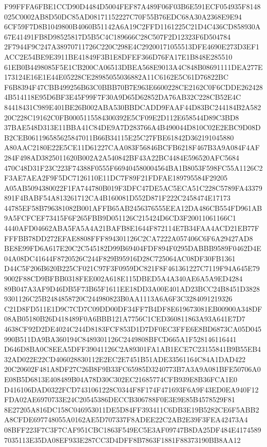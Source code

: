 \documentclass[UTF8,fontset=fandol,zihao=-4,a4paper]{ctexart}
\begin{document}
{{F99FFFA6FBE1CCD90D4484D5004FEF87A489F06F03B6E591ECF054935F8148025C0002AB8D50DC85AD08171152227C70F55B76EDC68A30A2368E9E94
6CF59F7D8B1049800B4060B51142A6A19C2FFD1161225C21D4C436CD858930A67E41491FB8D98525817D5B5C4C189666C28C507F2D12323F6D504784
2F7944F9C247A38970711726C220C298E4C29200171055513DFE4690E273D3EF1ACC2E54BE9E3911BE41849F3B1E8DFEF366D76FA17E1B848E285510
61EB0B4498085F5E1CB200CA06513DBEA568E9013A4C848B08691111DEA277E173124E16E1E44E05228CE28985055036882A11C6162E5C61D76822BC
F6B8394F47CBB499256B63C0BBB70B7E963E6600228CE2162C0F6CDDE2624284B514118E95D6BF3E45F99F7F30A9D65D62852DA76AB32C228CB52E4C
84418431C989E401BE26B002ABA530BBDCADD9FAAF44D83BC244184B2A58220C228C19162C0FB0005115584300392E5CF09E2D112E658544D89C3BD8
37BAE548D313E11BBA41C84DE9A7D283766A4B490044D810C02E2EBC9D08DB2CEB061196585625847011B66B34115E25C27FBE61842D362191045880
A80AAC2180E22E5CE11D61227CAA083F56846BCFB6218F467B3A9A084F4AF284F498AD3825011620B002A2A540842BF43A22BC4484E596520AFC5684
470C48D31F23C223F74388F0555F669404580004564BA1B8053F598FC55A1126C2F3AE7AEA2F9F5DC7126110E11DC7F89F21FDFAE189795584F29205
A05AB5094380022F1FA744780B019F3DFC47DE5AC5ECA51C228C5789FA43379891F4BABF54A813261712CA4B160081D552D871F222C2458474E17173
44785EF58B796381082B001AFFB65AB2456376555EEA12DA486CB554FD961AB9A5FCFCEF73415F6F265FBB9D051126C215424D6CD3F20011061166C1
4440AFD04662ABA5FA5A4A21BAFB8E1644F872114E7B34FAA4ACD21EB77FFFFBB78DD272EFAE8808FFF894301126C2CA7222A057406C6F6A29427AD8
BE8E99FD6A617E20C2C545182D99B69404FDF894F0295DABBB9589F0462D4E04A08DC41644F8720526C244F829B95916D28C725064AC08DF30FB1361
D44C5F206B620B225CF021C97F3F0959DC821F8F461361227C7119F94A645E799002F88CD9BFBB0318FEE002A618E115DBED5A4A340AE6A5A9ED4284
89B047A3AF9D46DB5F73B65F1611EE18DD3A00E401AD23BCC24B8451D38289301126C25B2484858720C244980823B0AA1113A6A6F3C3284091219326
C21D8FD511E1D9C7CD7C09DD00DF34FF7B4DF8E619673081EB00900A348DF08AB05180B26D418489F0A6BBB121A7756C1CED360811863A93A641E7D7
4638CF92D2DE4024C244D8183FCF853D1D7DF0EC3FFE6E8BD6873CA05D045990B511DA9BA360194C8489301126C2449808BFCD665A1F528146116441
D646D8BA0C8EEA5DFF39041126C2A89301FA1AB1ECE7C23155841B9B55EB432AD022E22CD406028830112E2EC2E7451B51ADE33561164C84A1DAD422
20C20602F481A8DF27C26B8F9B33FC65985D3240773B7A3A9A081BFE50706A0E08B5D6813E408489B04A78D30C302EC21685774CFB939E8B36FCA1E0
D416106DAD0322FCD7431061228C0344F8F174F471693F6A9F43ED0EA940F12FDA02AE6970733E24C20545386DECCB306788F0E3E9E85B4578529F81
8E27205A816DC158C046953011DE5D84FF393411C6DB3E19B5282CE6F5ABB2A8CFDE697748055A0162AE5D707337F8ADEE22C2AB2E39F3FEA42473A4
08BFF223F7C3F7CAF951CBC1863F549EC5E3AF09747B8DA25DF484E41745897035113E35DA08EF933E287CC3D4DFF8B7863F1881F88373190BB8AA12
}}
\end{document}
